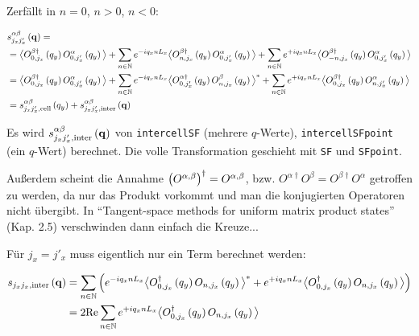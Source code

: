 \documentclass[12pt,paper=a4,BCOR=16mm]{article}
\begin{document}
Zerf\"allt in $n=0$, $n>0$, $n<0$:

\begin{equation}
\begin{split}
&s^{\alpha\beta}_{j_xj'_x}\left(\mathbf{q}\right) =\\
                           &= \big< O^{\beta\dagger}_{0,j_x}\left(q_y\right) O^{\alpha}_{0,j'_x}\left(q_y\right) \big> + 
                               \sum_{n\in\mathbb{N}} e^{-iq_xnL_x} \big< O^{\beta\dagger}_{n,j_x}\left(q_y\right) O^{\alpha}_{0,j'_x}\left(q_y\right) \big> +
                               \sum_{n\in\mathbb{N}} e^{+iq_xnL_x} \big< O^{\beta\dagger}_{-n,j_x}\left(q_y\right) O^{\alpha}_{0,j'_x}\left(q_y\right) \big> \\
                            &= \big< O^{\beta\dagger}_{0,j_x}\left(q_y\right) O^{\alpha}_{0,j'_x}\left(q_y\right) \big> + 
                               \sum_{n\in\mathbb{N}} e^{-iq_xnL_x} \big< O^{\alpha\dagger}_{0,j'_x}\left(q_y\right) O^{\beta}_{n,j_x}\left(q_y\right) \big>^* + 
                               \sum_{n\in\mathbb{N}} e^{+iq_xnL_x} \big< O^{\beta\dagger}_{0,j_x}\left(q_y\right) O^{\alpha}_{n,j'_x}\left(q_y\right) \big>\\
                            &= s^{\alpha\beta}_{j_xj'_x,\text{cell}}\left(q_y\right) + s^{\alpha\beta}_{j_xj'_x,\text{inter}}\left(\mathbf{q}\right)
\end{split}
\end{equation}

Es wird $s^{\alpha\beta}_{j_xj'_x,\text{inter}}\left(\mathbf{q}\right)$ von \texttt{intercellSF} (mehrere $q$-Werte), \texttt{intercellSFpoint} (ein $q$-Wert) berechnet. Die volle Transformation geschieht mit \texttt{SF} und \texttt{SFpoint}.

Au{\ss}erdem scheint die Annahme $\left(O^{\alpha,\beta}\right)^{\dagger}=O^{\alpha,\beta}$, bzw. $O^{\alpha\dagger}O^{\beta} = O^{\beta\dagger}O^{\alpha}$ getroffen zu werden, da nur das Produkt vorkommt und man die konjugierten Operatoren nicht \"ubergibt. In ``Tangent-space methods for uniform matrix product states'' (Kap. 2.5) verschwinden dann einfach die Kreuze...

F\"ur $j_x=j'_x$ muss eigentlich nur ein Term berechnet werden:

\begin{equation}
\begin{split}
s_{j_xj_x,\text{inter}}\left(\mathbf{q}\right) &= \sum_{n\in\mathbb{N}} \left(e^{-iq_xnL_x}\big< O^{\dagger}_{0,j_x}\left(q_y\right) O_{n,j_x}\left(q_y\right) \big>^* + e^{+iq_xnL_x}\big< O^{\dagger}_{0,j_x}\left(q_y\right) O_{n,j_x}\left(q_y\right) \big>\right)\\
                                                &= 2\text{Re} \sum_{n\in\mathbb{N}} e^{+iq_xnL_x} \big< O_{0,j_x}^{\dagger}\left(q_y\right) O_{n,j_x}\left(q_y\right) \big>
\end{split}
\end{equation}
\end{document}
